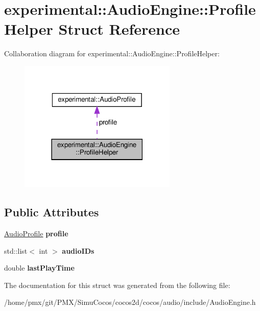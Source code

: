 \hypertarget{structexperimental_1_1AudioEngine_1_1ProfileHelper}{}\section{experimental\+:\+:Audio\+Engine\+:\+:Profile\+Helper Struct Reference}
\label{structexperimental_1_1AudioEngine_1_1ProfileHelper}


Collaboration diagram for experimental\+:\+:Audio\+Engine\+:\+:Profile\+Helper\+:
\nopagebreak
\begin{figure}[H]
\begin{center}
\leavevmode
\includegraphics[width=213pt]{structexperimental_1_1AudioEngine_1_1ProfileHelper__coll__graph}
\end{center}
\end{figure}
\subsection*{Public Attributes}
\begin{DoxyCompactItemize}
\item 
\mbox{\label{structexperimental_1_1AudioEngine_1_1ProfileHelper_abb4bc68d78bd785f1c1ef1a14acb1ed7}} 
\hyperlink{classexperimental_1_1AudioProfile}{Audio\+Profile} {\bfseries profile}
\item 
\mbox{\label{structexperimental_1_1AudioEngine_1_1ProfileHelper_a3163546b73544bd8f1a42e8f8b80cbaf}} 
std\+::list$<$ int $>$ {\bfseries audio\+I\+Ds}
\item 
\mbox{\label{structexperimental_1_1AudioEngine_1_1ProfileHelper_a71df81ee3755f8861d75ef7547f70ca5}} 
double {\bfseries last\+Play\+Time}
\end{DoxyCompactItemize}


The documentation for this struct was generated from the following file\+:\begin{DoxyCompactItemize}
\item 
/home/pmx/git/\+P\+M\+X/\+Simu\+Cocos/cocos2d/cocos/audio/include/Audio\+Engine.\+h\end{DoxyCompactItemize}
